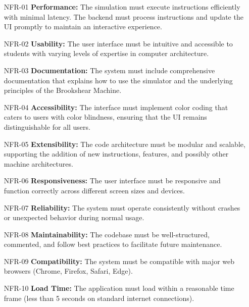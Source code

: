 \begin{enumerate}
    \item[NFR-01] \textbf{Performance:} The simulation must execute instructions efficiently with minimal latency. The backend must process instructions and update the UI promptly to maintain an interactive experience.
    
    \item[NFR-02] \textbf{Usability:} The user interface must be intuitive and accessible to students with varying levels of expertise in computer architecture.
    
    \item[NFR-03] \textbf{Documentation:} The system must include comprehensive documentation that explains how to use the simulator and the underlying principles of the Brookshear Machine.
    
    \item[NFR-04] \textbf{Accessibility:} The interface must implement color coding that caters to users with color blindness, ensuring that the UI remains distinguishable for all users.
    
    \item[NFR-05] \textbf{Extensibility:} The code architecture must be modular and scalable, supporting the addition of new instructions, features, and possibly other machine architectures.
    
    \item[NFR-06] \textbf{Responsiveness:} The user interface must be responsive and function correctly across different screen sizes and devices.
    
    \item[NFR-07] \textbf{Reliability:} The system must operate consistently without crashes or unexpected behavior during normal usage.
    
    \item[NFR-08] \textbf{Maintainability:} The codebase must be well-structured, commented, and follow best practices to facilitate future maintenance.
    
    \item[NFR-09] \textbf{Compatibility:} The system must be compatible with major web browsers (Chrome, Firefox, Safari, Edge).
    
    \item[NFR-10] \textbf{Load Time:} The application must load within a reasonable time frame (less than 5 seconds on standard internet connections).
\end{enumerate}

